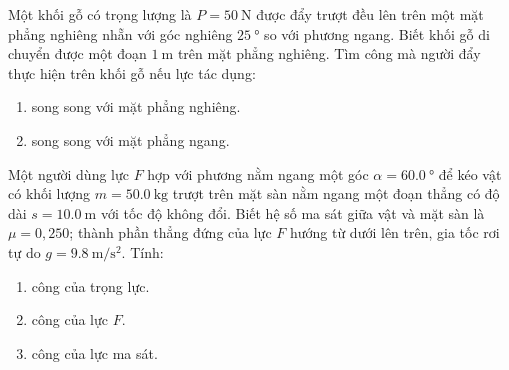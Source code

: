 \begin{ex}
	Một khối gỗ có trọng lượng là $P=\SI{50}{\newton}$ được đẩy trượt đều lên trên một mặt phẳng nghiêng nhẵn với góc nghiêng $\SI{25}{\degree}$ so với phương ngang. Biết khối gỗ di chuyển được một đoạn $\SI{1}{\meter}$ trên mặt phẳng nghiêng. Tìm công mà người đẩy thực hiện trên khối gỗ nếu lực tác dụng:
	\begin{enumerate}[label=\alph*)]
		\item song song với mặt phẳng nghiêng.
		\item song song với mặt phẳng ngang.
	\end{enumerate}
\end{ex}
\begin{ex}
Một người dùng lực $F$ hợp với phương nằm ngang một góc $\alpha=\SI{60.0}{\degree}$ để kéo vật có khối lượng $m=\SI{50.0}{\kilogram}$ trượt trên mặt sàn nằm ngang một đoạn thẳng có độ dài $s=\SI{10.0}{\meter}$ với tốc độ không đổi. Biết hệ số ma sát giữa vật và mặt sàn là $\mu=0,250$; thành phần thẳng đứng của lực $F$ hướng từ dưới lên trên, gia tốc rơi tự do $g=\SI{9.8}{\meter/\second^2}$. Tính:	
\begin{enumerate}[label=\alph*)]
	\item công của trọng lực.
	\item công của lực $F$.
	\item công của lực ma sát.
\end{enumerate}
\end{ex}
